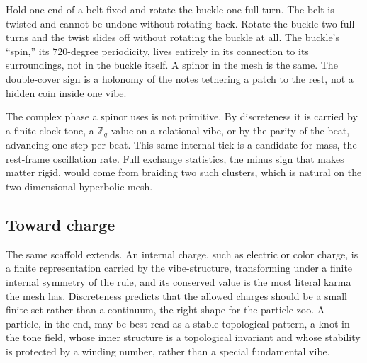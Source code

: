\begin{proposition}
Hold one end of a belt fixed and rotate the buckle one full turn. The belt is twisted and cannot be undone without rotating back. Rotate the buckle two full turns and the twist slides off without rotating the buckle at all. The buckle's ``spin,'' its $720$-degree periodicity, lives entirely in its connection to its surroundings, not in the buckle itself. A spinor in the mesh is the same. The double-cover sign is a holonomy of the notes tethering a patch to the rest, not a hidden coin inside one vibe.
\end{proposition}

The complex phase a spinor uses is not primitive. By discreteness it is carried by a finite clock-tone, a $\mathbb{Z}_q$ value on a relational vibe, or by the parity of the beat, advancing one step per beat. This same internal tick is a candidate for mass, the rest-frame oscillation rate. Full exchange statistics, the minus sign that makes matter rigid, would come from braiding two such clusters, which is natural on the two-dimensional hyperbolic mesh.

\subsection{Toward charge}

The same scaffold extends. An internal charge, such as electric or color charge, is a finite representation carried by the vibe-structure, transforming under a finite internal symmetry of the rule, and its conserved value is the most literal karma the mesh has. Discreteness predicts that the allowed charges should be a small finite set rather than a continuum, the right shape for the particle zoo. A particle, in the end, may be best read as a stable topological pattern, a knot in the tone field, whose inner structure is a topological invariant and whose stability is protected by a winding number, rather than a special fundamental vibe.
